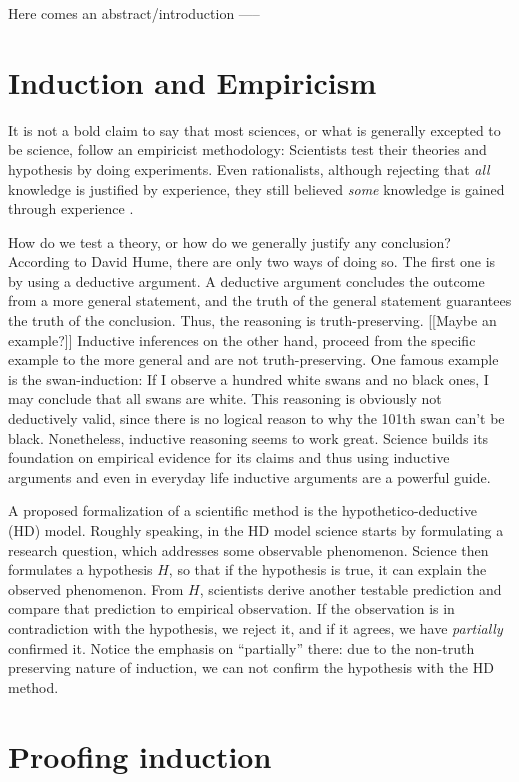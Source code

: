 Here comes an abstract/introduction -----

\section{Induction and Empiricism}

It is not a bold claim to say that most sciences,
or what is generally excepted to be science, follow
an empiricist methodology:
Scientists test their theories and hypothesis by doing experiments.
Even rationalists, although rejecting that \emph{all}
knowledge is justified by experience,
they still believed \emph{some} knowledge is gained through experience
\cite[9]{philsciencebook}.

How do we test a theory, or how do we generally justify
any conclusion?
According to David Hume, there are only two ways of doing so.
The first one is by using a deductive argument.
A deductive argument concludes the outcome from a
more general statement, and the truth of the general statement
guarantees the truth of the conclusion. Thus, the reasoning
is truth-preserving.
[[Maybe an example?]]
Inductive inferences on the other hand, proceed from
the specific example to the more general and are not
truth-preserving.
One famous example is the swan-induction:
If I observe a hundred white swans and no black ones, I may conclude
that all swans are white.
This reasoning is obviously not deductively valid, since
there is no logical reason to why the 101th swan can't be black.
Nonetheless, inductive reasoning seems to
work great.
Science builds its foundation on empirical evidence for its
claims and thus using inductive arguments and even in everyday
life inductive arguments are a powerful guide.

A proposed formalization of a scientific method is the
hypothetico-deductive (HD) model. Roughly speaking,
in the HD model science starts by formulating a research question,
which addresses some observable phenomenon.
Science then formulates a hypothesis $H$, so that if the hypothesis is true,
it can explain the observed phenomenon. From $H$, scientists
derive another testable prediction and compare that prediction
to empirical observation.
If the observation is in contradiction with the hypothesis, we reject it,
and if it agrees, we have \emph{partially} confirmed it.
Notice the emphasis on \enquote{partially} there: due to the
non-truth preserving nature of induction, we can not confirm the
hypothesis with the HD method.


\section{Proofing induction}

